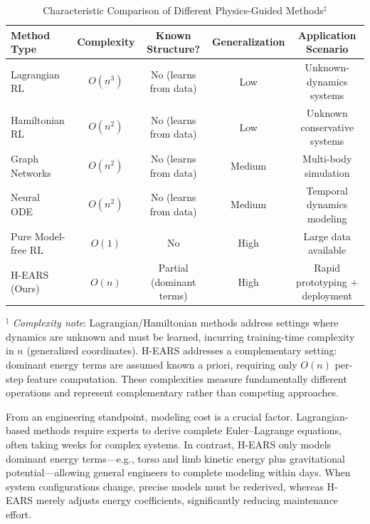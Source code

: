 \documentclass[journal]{IEEEtran}
\begin{document}
	\begin{table}[!t]
		\captionsetup{font=footnotesize, labelfont=footnotesize}
		\caption{Characteristic Comparison of Different Physics-Guided Methods$^\ddagger$}
		\label{tab:physics_methods_comparison}
		\centering
		\footnotesize
		\begin{tabular}{lcccc}
			\toprule
			\textbf{Method Type} & \textbf{Complexity} & \textbf{Known Structure?} & \textbf{Generalization} & \textbf{Application Scenario} \\
			\midrule
			Lagrangian RL~\cite{lutter2019deep}       & $O(n^3)$ & No (learns from data) & Low    & Unknown-dynamics systems \\
			Hamiltonian RL~\cite{greydanus2019hamiltonian} & $O(n^2)$ & No (learns from data) & Low    & Unknown conservative systems \\
			Graph Networks~\cite{sanchez2020learning} & $O(n^2)$ & No (learns from data) & Medium & Multi-body simulation \\
			Neural ODE~\cite{chen2018neural}          & $O(n^2)$ & No (learns from data) & Medium & Temporal dynamics modeling \\
			Pure Model-free RL                        & $O(1)$   & No                    & High   & Large data available \\
			H-EARS (Ours)                             & $O(n)$   & Partial (dominant terms) & High & Rapid prototyping + deployment \\
			\bottomrule
		\end{tabular}
		\vspace{1mm}
		
		\footnotesize{$^\ddagger$ \textit{Complexity note}: Lagrangian/Hamiltonian methods address settings where dynamics are unknown and must be learned, incurring training-time complexity in $n$ (generalized coordinates). H-EARS addresses a complementary setting: dominant energy terms are assumed known a priori, requiring only $O(n)$ per-step feature computation. These complexities measure fundamentally different operations and represent complementary rather than competing approaches.}
	\end{table}
	
	From an engineering standpoint, modeling cost is a crucial factor. Lagrangian-based methods require experts to derive complete Euler–Lagrange equations, often taking weeks for complex systems. In contrast, H-EARS only models dominant energy terms—e.g., torso and limb kinetic energy plus gravitational potential—allowing general engineers to complete modeling within days. When system configurations change, precise models must be rederived, whereas H-EARS merely adjusts energy coefficients, significantly reducing maintenance effort.
	
\end{document}
